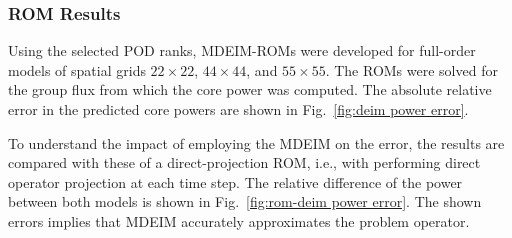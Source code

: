 \documentclass[review,number,sort&compress,12pt]{elsarticle}
\begin{document}
\subsubsection{ROM Results}

Using the selected POD ranks, MDEIM-ROMs were developed for full-order models of spatial grids $22\times 22$, $44\times44$, and $55 \times 55$.
The ROMs were solved for the group flux from which the core power was computed.
The absolute relative error in the predicted core powers are shown in Fig.~\ref{fig:deim power error}.

To understand the impact of employing the MDEIM on the error, the results are compared with these of a direct-projection ROM, i.e., with performing direct operator projection at each time step.
The relative difference of the power between both models is shown in Fig.~\ref{fig:rom-deim power error}.
The shown errors implies that MDEIM accurately approximates the problem operator.
\end{document}

